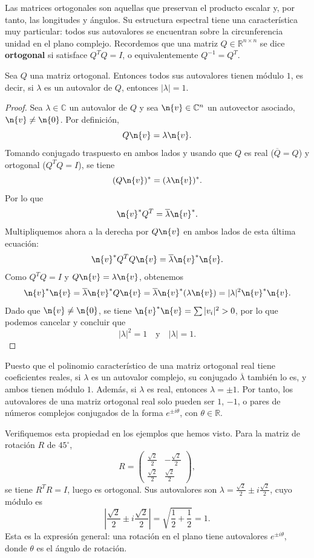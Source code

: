 Las matrices ortogonales son aquellas que preservan el producto escalar y, por tanto, las longitudes y ángulos. Su estructura espectral tiene una característica muy particular: todos sus autovalores se encuentran sobre la circunferencia unidad en el plano complejo.
Recordemos que 
una matriz $Q\in\mathbb{R}^{n\times n}$ se dice \textbf{ortogonal} si satisface $Q^T Q = I$, o equivalentemente $Q^{-1} = Q^T$.

\begin{thm}
Sea $Q$ una matriz ortogonal. Entonces todos sus autovalores tienen módulo $1$, es decir, si $\lambda$ es un autovalor de $Q$, entonces $|\lambda| = 1$.
\end{thm}

\begin{proof}
Sea $\lambda\in\mathbb{C}$ un autovalor de $Q$ y sea $\n{v}\in\mathbb{C}^n$ un autovector asociado, $\n{v}\neq \n{0}$. Por definición,
\[
Q\n{v} = \lambda \n{v}.
\]
Tomando conjugado traspuesto en ambos lados y usando que $Q$ es real ($\overline{Q}=Q$) y ortogonal ($Q^T Q = I$), se tiene
\[
(Q\n{v})^* = (\lambda \n{v})^*. \]
Por lo que
\[\n{v}^* Q^T = \overline{\lambda} \n{v}^*.
\]
Multipliquemos ahora a la derecha por $Q\n{v}$ en ambos lados de esta última ecuación:
\[
\n{v}^* Q^T Q \n{v} = \overline{\lambda} \n{v}^* \n{v}.
\]
Como $Q^T Q = I$ y $Q\n{v} = \lambda \n{v}$, obtenemos
\[
\n{v}^* \n{v} = \overline{\lambda} \n{v}^* Q\n{v} = \overline{\lambda} \n{v}^* (\lambda \n{v}) = |\lambda|^2 \n{v}^* \n{v}.
\]
Dado que $\n{v}\neq \n{0}$, se tiene $\n{v}^*\n{v} = \sum |v_i|^2 > 0$, por lo que podemos cancelar y concluir que
\[
|\lambda|^2 = 1 \quad\text{y}\quad |\lambda| = 1.
\]
\end{proof}


Puesto que el polinomio característico de una matriz ortogonal real tiene coeficientes reales, si $\lambda$ es un autovalor complejo, su conjugado $\overline{\lambda}$ también lo es, y ambos tienen módulo $1$. Además, si $\lambda$ es real, entonces $\lambda = \pm 1$. Por tanto, los autovalores de una matriz ortogonal real solo pueden ser $1$, $-1$, o pares de números complejos conjugados de la forma $e^{\pm i\theta}$, con $\theta\in\mathbb{R}$.

Verifiquemos esta propiedad en los ejemplos que hemos visto. Para la matriz de rotación $R$ de $45^\circ$,
\[
R = \begin{pmatrix} \frac{\sqrt{2}}{2} & -\frac{\sqrt{2}}{2} \\[1mm] \frac{\sqrt{2}}{2} & \frac{\sqrt{2}}{2} \end{pmatrix},
\]
se tiene $R^T R = I$, luego es ortogonal. Sus autovalores son $\lambda = \frac{\sqrt{2}}{2} \pm i\frac{\sqrt{2}}{2}$, cuyo módulo es
\[
\left|\frac{\sqrt{2}}{2} \pm i\frac{\sqrt{2}}{2}\right| = \sqrt{\frac{1}{2} + \frac{1}{2}} = 1.
\]
Esta es la expresión general: una rotación en el plano tiene autovalores $e^{\pm i\theta}$, donde $\theta$ es el ángulo de rotación.

